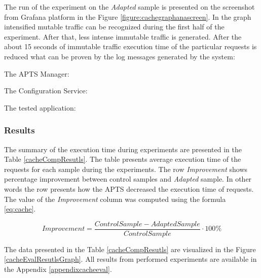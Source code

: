 \documentclass[12pt,a4paper]{article}
\begin{document}
The run of the experiment on the \textit{Adapted} sample is presented on the screenshot from Grafana platform in the Figure \ref{figure:cachegraphanascreen}. In the graph intensified mutable traffic can be recognized during the first half of the experiment. After that, less intense immutable traffic is generated. After the about 15 seconds of immutable traffic execution time of the particular requests is reduced what can be proven by the log messages generated by the system:

The APTS Manager:

\noindent{}\vspace{1mm}

The Configuration Service:

\vspace{1mm}\noindent{}\vspace{1mm}

The tested application:

\vspace{1mm}\noindent{}\vspace{1mm}
 

\subsubsection{Results} 

The summary of the execution time during experiments are presented in the Table \ref{cacheCompResutls}. The table presents average execution time of the requests for each sample during the experiments. The row \textit{Improvement} shows percentage improvement between control samples and \textit{Adapted} sample. In other words the row presents how the APTS decreased the execution time of requests. The value of the \textit{Improvement} column was computed using the formula \eqref{eq:cache}. 

\begin{equation} \label{eq:cache}
Improvement = \frac{ControlSample - AdaptedSample}{ControlSample} \cdot 100\%
\end{equation}

The data presented in the Table \ref{cacheCompResutls} are visualized in the Figure \ref{cacheEvalResutlsGraph}.  All results from performed experiments are available in the Appendix \ref{appendixcacheeval}. 
\end{document}
